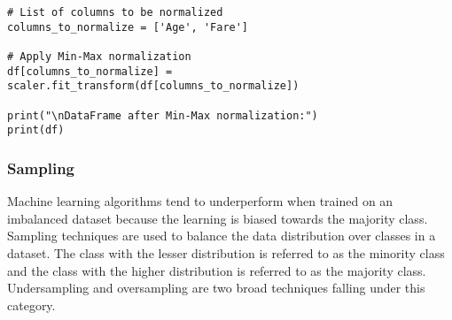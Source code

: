 \documentclass[11pt]{article}
\begin{document}
\begin{enumerate}
\begin{enumerate}
\begin{verbatim}
# List of columns to be normalized
columns_to_normalize = ['Age', 'Fare']

# Apply Min-Max normalization
df[columns_to_normalize] = scaler.fit_transform(df[columns_to_normalize])

print("\nDataFrame after Min-Max normalization:")
print(df)
\end{verbatim}
\end{enumerate}
\end{enumerate}
\subsubsection{Sampling}
\label{sec:org64a3ed1}
Machine learning algorithms tend to underperform when trained on an imbalanced dataset because the learning is biased towards the majority class.
Sampling techniques are used to balance the data distribution over classes in a dataset. The class with the lesser distribution is referred to as the minority class and the class with the higher distribution is referred to as the majority class. Undersampling and oversampling are two broad techniques falling under this category.
\end{document}
